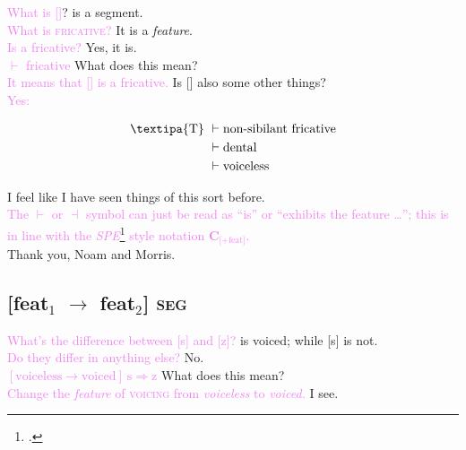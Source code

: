 \documentclass{report}[12pt]
\begin{document}
\begin{tcolorbox}
  \textcolor{violet}{What is []}? \quad [\textipa{T}] is a segment. \\
  \textcolor{violet}{What is \textsc{fricative}?} \quad It is a \emph{feature}. \\
  \textcolor{violet}{Is  a fricative?} \quad Yes, it is. \\
  \textcolor{violet}{ $\vdash$ fricative} \quad What does this mean? \\
  \textcolor{violet}{It means that [] is a fricative.} \quad Is [] also some other things? \\  
  \textcolor{violet}{Yes:}
  \begin{tcolorbox}
    \begin{align*}
    \text{\textipa{T}}\ & \vdash \text{non-sibilant fricative} \\
                      & \vdash \text{dental} \\
                      & \vdash \text{voiceless} 
    \end{align*}
  \end{tcolorbox}
  I feel like I have seen things of this sort before. \\
  \textcolor{violet}{The $\vdash$ or $\dashv$ symbol can just be read as ``is'' or ``exhibits the feature \dots''; this is in line with the \emph{SPE}\footcite{spe} style notation $\textbf{C}_{\text{[+feat]}}$.} \\ 
  Thank you, Noam and Morris. \\
\end{tcolorbox}

\subsection*{[feat$_1$ $\rightarrow$ feat$_2$] \textsc{seg}}

\begin{tcolorbox}
  \textcolor{violet}{What's the difference between [s] and [z]?} \quad [z] is voiced; while [s] is not. \\
  \textcolor{violet}{Do they differ in anything else?} \quad No. \\
  \textcolor{violet}{$[\text{voiceless} \rightarrow \text{voiced}]\ \text{s} \Rightarrow \text{z}$} \quad What does this mean? \\
  \textcolor{violet}{Change the \emph{feature} of \textsc{voicing} from \emph{voiceless} to \emph{voiced.}} \quad I see. \\  
\end{tcolorbox}
\end{document}
